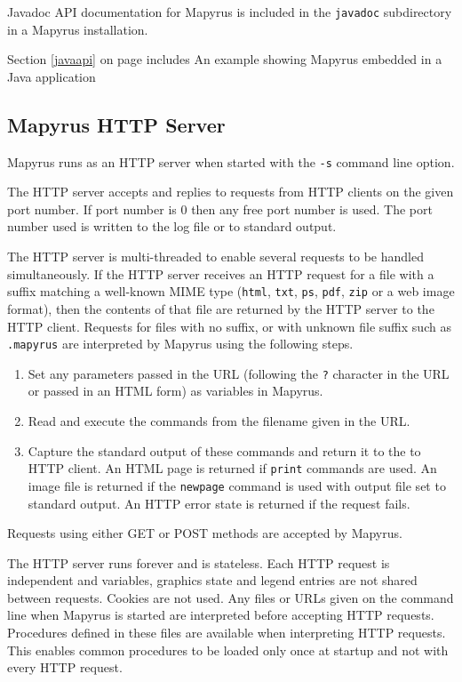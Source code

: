 Javadoc API documentation for Mapyrus is included in the
\texttt{javadoc} subdirectory in a Mapyrus installation.

Section \ref{javaapi} on page \pageref{javaapi} includes
An example showing Mapyrus embedded in a Java application

\subsection{Mapyrus HTTP Server}

Mapyrus runs as an HTTP server when started with the \texttt{-s} command line
option.

The HTTP server accepts and replies to requests from HTTP clients on the given
port number.  If port number is 0 then any free port number is used.  The port
number used is written to the log file or to standard output.

The HTTP server is multi-threaded to enable several requests to be handled
simultaneously.  If the HTTP server receives an HTTP request for a file with a
suffix matching a well-known MIME type (\texttt{html}, \texttt{txt},
\texttt{ps}, \texttt{pdf}, \texttt{zip} or a web image format), then the
contents of that file are returned by the HTTP server to the HTTP client.
Requests for files with no suffix, or with unknown file suffix
such as \texttt{.mapyrus} are interpreted
by Mapyrus using the following steps.

\begin{enumerate}
\item
Set any parameters passed in the URL (following the \texttt{?} character in
the URL or passed in an HTML form) as variables in Mapyrus.
\item
Read and execute the commands from the filename given in the URL.
\item
Capture the standard output of these commands and return it to the
to HTTP client.  An HTML page is returned if
\texttt{print} commands are used.  An image file is
returned if the
\texttt{newpage} command is used with output file set
to standard output.
An HTTP error state is returned if the request fails.
\end{enumerate}

Requests using either GET or POST methods are accepted by Mapyrus.

The HTTP server runs forever and
is stateless.  Each HTTP request is independent and
variables, graphics state and legend entries are not shared between
requests.  Cookies are not used.
Any files or URLs given on the command line when Mapyrus is started
are interpreted before accepting HTTP requests.
Procedures defined in these files
are available when interpreting HTTP requests.  This enables
common procedures to be loaded only once at startup and not with every
HTTP request.


